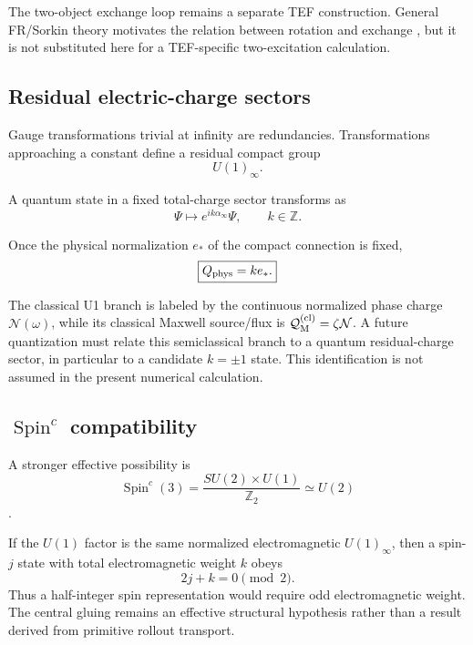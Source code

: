 \documentclass[11pt]{article}
\begin{document}
The two-object exchange loop remains a separate TEF construction. General FR/Sorkin theory motivates the relation between rotation and exchange \cite{Sorkin1988,AucklySpeight2006}, but it is not substituted here for a TEF-specific two-excitation calculation.

\subsection{Residual electric-charge sectors}

Gauge transformations trivial at infinity are redundancies. Transformations approaching a constant define a residual compact group
\begin{equation}
U(1)_\infty.
\end{equation}

A quantum state in a fixed total-charge sector transforms as
\begin{equation}
\boxed{
\Psi
\mapsto
e^{ik\alpha_\infty}\Psi,
\qquad
k\in\mathbb Z.
}
\end{equation}

Once the physical normalization \(e_*\) of the compact connection is fixed,
\begin{equation}
\boxed{
Q_{\rm phys}=k e_*.
}
\end{equation}

The classical U1 branch is labeled by the continuous normalized phase charge \(\mathcal N(\omega)\), while its classical Maxwell source/flux is \(\mathcal Q_{\rm M}^{\rm(cl)}=\zeta\mathcal N\). A future quantization must relate this semiclassical branch to a quantum residual-charge sector, in particular to a candidate \(k=\pm1\) state. This identification is not assumed in the present numerical calculation.

\subsection{\texorpdfstring{\(\operatorname{Spin}^c\)}{Spin-c} compatibility}

A stronger effective possibility is
\begin{equation}
\operatorname{Spin}^c(3)
=
\frac{SU(2)\times U(1)}{\mathbb Z_2}
\simeq
U(2)
\end{equation}
\cite{Nicolaescu2000}.

If the \(U(1)\) factor is the same normalized electromagnetic \(U(1)_\infty\), then a spin-\(j\) state with total electromagnetic weight \(k\) obeys
\begin{equation}
\boxed{
2j+k=0\pmod2.
}
\end{equation}
Thus a half-integer spin representation would require odd electromagnetic weight. The central gluing remains an effective structural hypothesis rather than a result derived from primitive rollout transport.
\end{document}
